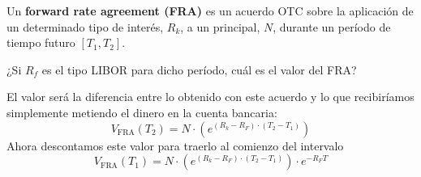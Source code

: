 \begin{problem}[2]
Un \textbf{forward rate agreement (FRA)} es un acuerdo OTC sobre la aplicación de un determinado
tipo de interés, $R_k$, a un principal, $N$, durante un período de tiempo futuro $[T_1,T_2]$.

¿Si $R_f$ es el tipo LIBOR para dicho período, cuál es el valor del FRA?
\solution
{}

El valor será la diferencia entre lo obtenido con este acuerdo y lo que recibiríamos simplemente
metiendo el dinero en la cuenta bancaria:
\[V_{\text{FRA}}(T_2) = N \cdot \left(e^{(R_k-R_F)\cdot (T_2-T_1)} \right)\]
Ahora descontamos este valor para traerlo al comienzo del intervalo
\[V_{\text{FRA}}(T_1) = N \cdot \left(e^{(R_k-R_F)\cdot (T_2-T_1)} \right) \cdot e^{-R_F T}\]

\end{problem}


